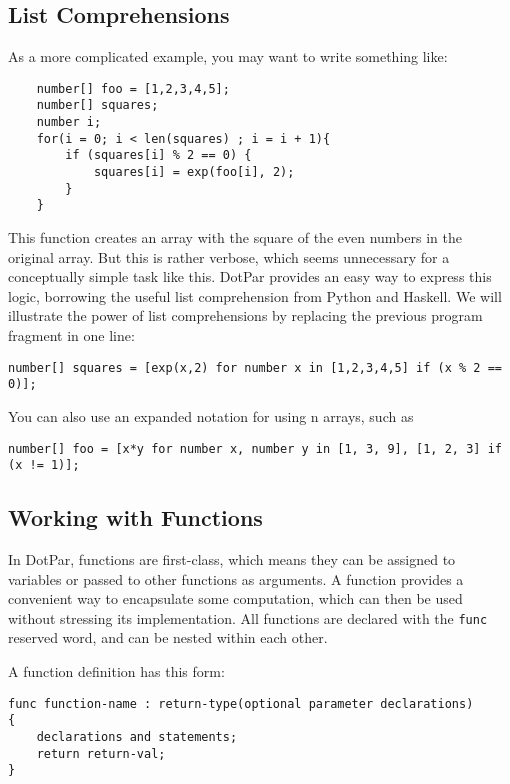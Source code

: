 \documentclass{article}
\begin{document}
\subsection{List Comprehensions}
As a more complicated example, you may want to write something like:

\begin{verbatim}
    number[] foo = [1,2,3,4,5];
    number[] squares;
    number i;
    for(i = 0; i < len(squares) ; i = i + 1){
        if (squares[i] % 2 == 0) {
            squares[i] = exp(foo[i], 2);
        }
    }
\end{verbatim}

This function creates an array with the square of the even numbers in the original array. But this is rather verbose, which seems unnecessary for a conceptually simple task like this. DotPar provides an easy way to express this logic, borrowing the useful list comprehension from Python and Haskell. We will illustrate the power of list comprehensions by replacing the previous program fragment in one line:

\begin{verbatim}
number[] squares = [exp(x,2) for number x in [1,2,3,4,5] if (x % 2 == 0)];
\end{verbatim}

You can also use an expanded notation for using n arrays, such as

\begin{verbatim}
number[] foo = [x*y for number x, number y in [1, 3, 9], [1, 2, 3] if (x != 1)];
\end{verbatim}

\subsection{Working with Functions}
In DotPar, functions are first-class, which means they can be assigned to variables or passed to other functions as arguments. A function provides a convenient way to encapsulate some computation, which can then be used without stressing its implementation. All functions are declared with the \verb=func= reserved word, and can be nested within each other.

A function definition has this form:

\begin{verbatim}
func function-name : return-type(optional parameter declarations)
{
    declarations and statements;
    return return-val;
}
\end{verbatim}
\end{document}
